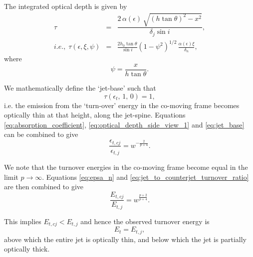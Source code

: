 The integrated optical depth is given by 
\begin{eqnarray}
\tau & = & \dfrac{2 \, \alpha(\epsilon) \, \sqrt{ (h \tan \theta)^{2} - x^2 }  }{ \delta_j \sin i },
\label{eq:optical_depth_side_view_1} \\
i.e., \; \tau( \epsilon, \xi, \psi ) & = & \frac{2 h_0 \tan \theta}{\sin i}(1-\psi^{2})^{1/2} \,\frac{\alpha(\epsilon) \xi}{\delta_{n}},
\label{eq:optical_depth_side_view_2}
\end{eqnarray} where
\begin{equation}
\psi = \frac{x}{h \tan \theta}.
\label{eq:psi}
\end{equation}

We mathematically define the `jet-base' such that
\begin{equation}
\tau \left( \epsilon_{t}, \, 1, \, 0 \right) = 1,
\label{eq:jet_base}
\end{equation}
i.e. the emission from the `turn-over' energy in the co-moving frame becomes optically thin at that height, along the jet-spine. Equations \ref{eq:absorption_coefficient}, \ref{eq:optical_depth_side_view_1} and \ref{eq:jet_base} can be combined to give
\begin{equation}
\frac{\epsilon_{t,cj}}{\epsilon_{t,j}} =  w^{-\frac{2}{p+4}} .
\label{eq:jet_to_counterjet_turnover_ratio}
\end{equation}

We note that the turnover energies in the co-moving frame become equal in the limit $ p \rightarrow \infty $. Equations \ref{eq:epsa_n} and \ref{eq:jet_to_counterjet_turnover_ratio} are then combined
to give 
\begin{equation}
\frac{ E_{t,cj} }{ E_{t,j} } = w^{ \frac{p+2}{p+4} }.
\label{eq:observed_turnover_ratio}
\end{equation}

This implies $ E_{t,cj} < E_{t,j} $ and hence the observed turnover energy is
\begin{equation}
E_{t} = E_{t,j},
\end{equation} above which the entire jet is optically thin, and below which the jet is partially optically 
thick.

